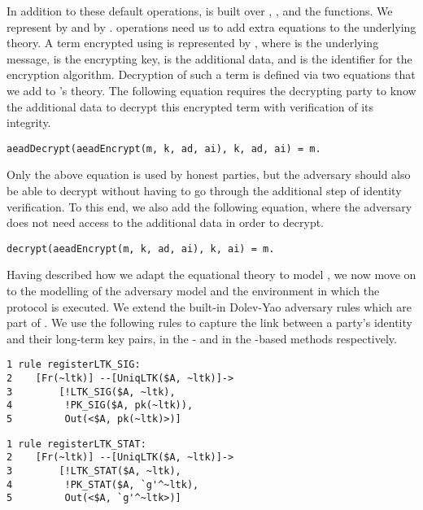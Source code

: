 In addition to these default operations, \mEdhoc{} is built over
\mHkdfExpand, \mHkdfExtract, and the \mAead{} functions.
%
We represent \mHkdfExpand{} by  and \mHkdfExtract{} by 
.
%
\mAead{} operations need us to add extra equations to the underlying theory.
%
A term encrypted using \mAead{} is represented by ,
where  is the underlying message,  is the encrypting key,
 is the additional data, and  is the identifier for the
encryption algorithm.
%
Decryption of such a term is defined via two equations that we add to
\mTamarin's theory.
%
The following equation requires the decrypting party to know the additional
data  to decrypt this encrypted term with verification of its integrity.
\begin{small}
\begin{verbatim}
aeadDecrypt(aeadEncrypt(m, k, ad, ai), k, ad, ai) = m.
\end{verbatim}
\end{small}
%
Only the above equation is used by honest parties, but the adversary should
also be able to decrypt without having to go through the additional step of
identity verification.
%
To this end, we also add the following equation, where the adversary does not
need access to the additional data  in order to decrypt.
%
\begin{small}\begin{verbatim}
decrypt(aeadEncrypt(m, k, ad, ai), k, ai) = m.
\end{verbatim}\end{small}
%

Having described how we adapt the equational theory to model \mEdhoc,
we now move on to the modelling of the adversary model and the 
environment in
which the protocol is executed.
%
We extend the built-in Dolev-Yao adversary rules which are part of 
\mTamarin.
%
We use the following rules to capture the link between a party's identity and
their long-term key pairs, in the \mSig{}- and in the \mStat{}-based methods
respectively.
\begin{center}
\begin{minipage}{0.48\textwidth}
\begin{small}
\begin{verbatim}
1 rule registerLTK_SIG:
2    [Fr(~ltk)] --[UniqLTK($A, ~ltk)]->
3        [!LTK_SIG($A, ~ltk),
4         !PK_SIG($A, pk(~ltk)),
5         Out(<$A, pk(~ltk)>)]
\end{verbatim}
\end{small}
\end{minipage}
\hfill\vline\hfill
\begin{minipage}{0.48\textwidth}
\begin{small}
\begin{verbatim}
1 rule registerLTK_STAT:
2    [Fr(~ltk)] --[UniqLTK($A, ~ltk)]->
3        [!LTK_STAT($A, ~ltk),
4         !PK_STAT($A, `g'^~ltk),
5         Out(<$A, `g'^~ltk>)]
\end{verbatim}
\end{small}
\end{minipage}
\end{center}

